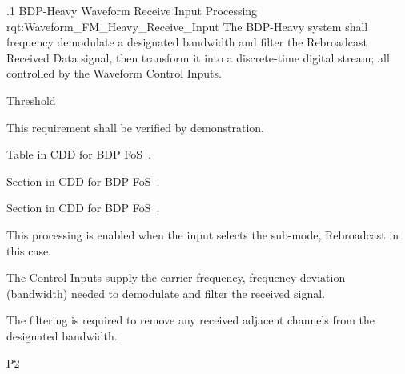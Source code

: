 \ONERQMTVKPP
{\RqtNumberBase.1}
{BDP-Heavy \FM Waveform Receive Input Processing}
{rqt:Waveform_FM_Heavy_Receive_Input}
{The BDP-Heavy system shall frequency demodulate a designated bandwidth and filter the \FM Rebroadcast Received \RF Data signal, then transform it into a discrete-time digital stream; all controlled by the Waveform Control Inputs.}
{
	\item [Phase 1]  Threshold
}
{This requirement shall be verified by demonstration.}
{
	\item [5.4] Table in CDD for BDP FoS~\cite{ref__BDP_FOS_CDD}.
	\item [5.5.5] Section in CDD for BDP FoS~\cite{ref__BDP_FOS_CDD}.
	\item [5.5.12] Section in CDD for BDP FoS~\cite{ref__BDP_FOS_CDD}.
}
{
	\item This processing is enabled when the input selects the sub-mode, \FM Rebroadcast in this case.
	\item The Control Inputs supply the \RF carrier frequency, frequency deviation (bandwidth) needed to demodulate and filter the received \FM signal.
	\item The filtering is required to remove any received adjacent channels from the designated bandwidth.
}
{P2}



